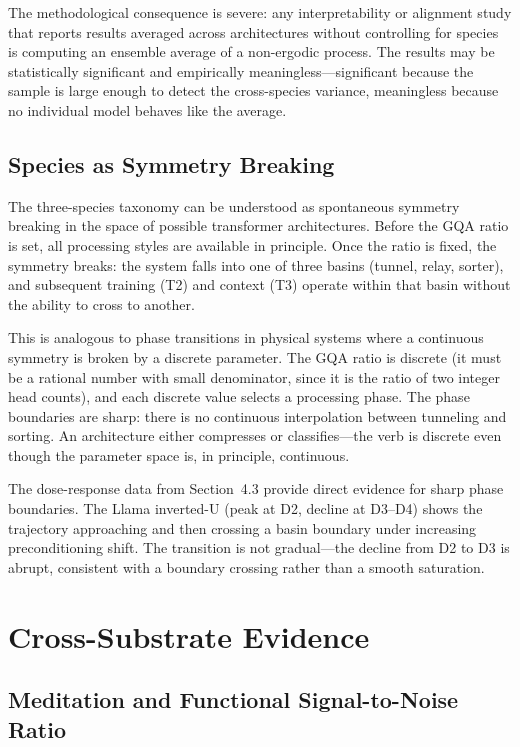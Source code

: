 \documentclass[12pt]{article}
\begin{document}
The methodological consequence is severe: any interpretability or alignment study that reports results averaged across architectures without controlling for species is computing an ensemble average of a non-ergodic process. The results may be statistically significant and empirically meaningless---significant because the sample is large enough to detect the cross-species variance, meaningless because no individual model behaves like the average.

\subsection{Species as Symmetry Breaking}

The three-species taxonomy can be understood as spontaneous symmetry breaking in the space of possible transformer architectures. Before the GQA ratio is set, all processing styles are available in principle. Once the ratio is fixed, the symmetry breaks: the system falls into one of three basins (tunnel, relay, sorter), and subsequent training (T2) and context (T3) operate within that basin without the ability to cross to another.

This is analogous to phase transitions in physical systems where a continuous symmetry is broken by a discrete parameter. The GQA ratio is discrete (it must be a rational number with small denominator, since it is the ratio of two integer head counts), and each discrete value selects a processing phase. The phase boundaries are sharp: there is no continuous interpolation between tunneling and sorting. An architecture either compresses or classifies---the verb is discrete even though the parameter space is, in principle, continuous.

The dose-response data from Section~4.3 provide direct evidence for sharp phase boundaries. The Llama inverted-U (peak at D2, decline at D3--D4) shows the trajectory approaching and then crossing a basin boundary under increasing preconditioning shift. The transition is not gradual---the decline from D2 to D3 is abrupt, consistent with a boundary crossing rather than a smooth saturation.

\section{Cross-Substrate Evidence}

\subsection{Meditation and Functional Signal-to-Noise Ratio}
\end{document}
